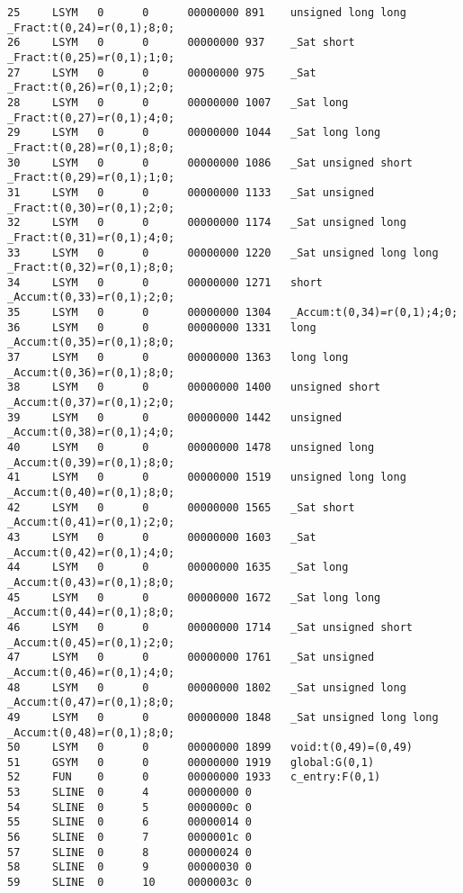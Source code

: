 \begin{lstlisting}
25     LSYM   0      0      00000000 891    unsigned long long _Fract:t(0,24)=r(0,1);8;0;
26     LSYM   0      0      00000000 937    _Sat short _Fract:t(0,25)=r(0,1);1;0;
27     LSYM   0      0      00000000 975    _Sat _Fract:t(0,26)=r(0,1);2;0;
28     LSYM   0      0      00000000 1007   _Sat long _Fract:t(0,27)=r(0,1);4;0;
29     LSYM   0      0      00000000 1044   _Sat long long _Fract:t(0,28)=r(0,1);8;0;
30     LSYM   0      0      00000000 1086   _Sat unsigned short _Fract:t(0,29)=r(0,1);1;0;
31     LSYM   0      0      00000000 1133   _Sat unsigned _Fract:t(0,30)=r(0,1);2;0;
32     LSYM   0      0      00000000 1174   _Sat unsigned long _Fract:t(0,31)=r(0,1);4;0;
33     LSYM   0      0      00000000 1220   _Sat unsigned long long _Fract:t(0,32)=r(0,1);8;0;
34     LSYM   0      0      00000000 1271   short _Accum:t(0,33)=r(0,1);2;0;
35     LSYM   0      0      00000000 1304   _Accum:t(0,34)=r(0,1);4;0;
36     LSYM   0      0      00000000 1331   long _Accum:t(0,35)=r(0,1);8;0;
37     LSYM   0      0      00000000 1363   long long _Accum:t(0,36)=r(0,1);8;0;
38     LSYM   0      0      00000000 1400   unsigned short _Accum:t(0,37)=r(0,1);2;0;
39     LSYM   0      0      00000000 1442   unsigned _Accum:t(0,38)=r(0,1);4;0;
40     LSYM   0      0      00000000 1478   unsigned long _Accum:t(0,39)=r(0,1);8;0;
41     LSYM   0      0      00000000 1519   unsigned long long _Accum:t(0,40)=r(0,1);8;0;
42     LSYM   0      0      00000000 1565   _Sat short _Accum:t(0,41)=r(0,1);2;0;
43     LSYM   0      0      00000000 1603   _Sat _Accum:t(0,42)=r(0,1);4;0;
44     LSYM   0      0      00000000 1635   _Sat long _Accum:t(0,43)=r(0,1);8;0;
45     LSYM   0      0      00000000 1672   _Sat long long _Accum:t(0,44)=r(0,1);8;0;
46     LSYM   0      0      00000000 1714   _Sat unsigned short _Accum:t(0,45)=r(0,1);2;0;
47     LSYM   0      0      00000000 1761   _Sat unsigned _Accum:t(0,46)=r(0,1);4;0;
48     LSYM   0      0      00000000 1802   _Sat unsigned long _Accum:t(0,47)=r(0,1);8;0;
49     LSYM   0      0      00000000 1848   _Sat unsigned long long _Accum:t(0,48)=r(0,1);8;0;
50     LSYM   0      0      00000000 1899   void:t(0,49)=(0,49)
51     GSYM   0      0      00000000 1919   global:G(0,1)
52     FUN    0      0      00000000 1933   c_entry:F(0,1)
53     SLINE  0      4      00000000 0      
54     SLINE  0      5      0000000c 0      
55     SLINE  0      6      00000014 0      
56     SLINE  0      7      0000001c 0      
57     SLINE  0      8      00000024 0      
58     SLINE  0      9      00000030 0      
59     SLINE  0      10     0000003c 0      

\end{lstlisting}
